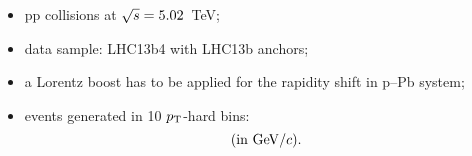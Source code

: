 \begin{itemize}
\item pp collisions at $\sqrt{s}=5.02$~TeV;
\item data sample: LHC13b4 with LHC13b anchors;
\item a Lorentz boost has to be applied for the rapidity shift in p--Pb system;
\item events generated in 10 $p_{\rm T}$-hard bins:
      \begin{equation}
[5,~11,~21,~36,~57,~84,~117,~152,~191,~234,~\infty]~({\rm in}~\GeVc).
      \end{equation}
\end{itemize}
